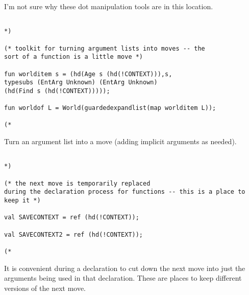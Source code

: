 \documentclass{article}
\begin{document}
I'm not sure why these dot manipulation tools are in this location.

\begin{verbatim}

*)

(* toolkit for turning argument lists into moves -- the
sort of a function is a little move *)

fun worlditem s = (hd(Age s (hd(!CONTEXT))),s,
typesubs (EntArg Unknown) (EntArg Unknown) 
(hd(Find s (hd(!CONTEXT)))));

fun worldof L = World(guardedexpandlist(map worlditem L));

(*

\end{verbatim}

Turn an argument list into a move (adding implicit arguments as needed).

\begin{verbatim}

*)

(* the next move is temporarily replaced 
during the declaration process for functions -- this is a place to keep it *)

val SAVECONTEXT = ref (hd(!CONTEXT));

val SAVECONTEXT2 = ref (hd(!CONTEXT));

(*

\end{verbatim}

It is convenient during a declaration to cut down the next move into just the arguments being used in that declaration.
These are places to keep different versions of the next move.
\end{document}
